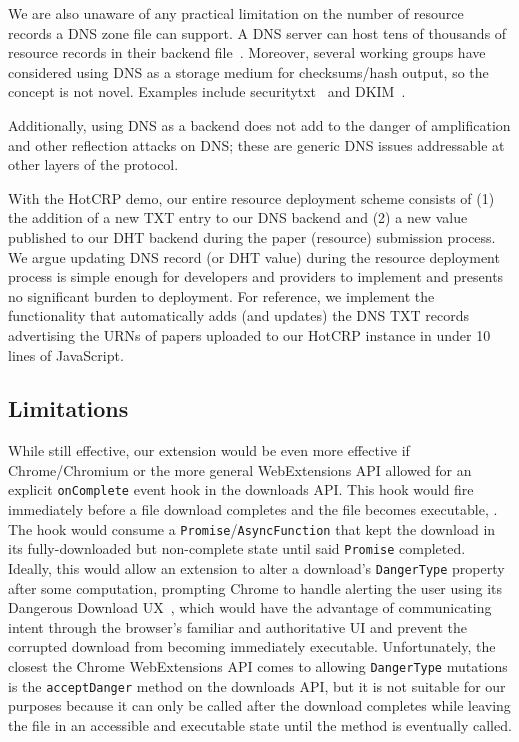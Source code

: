 We are also unaware of any practical limitation on the number of resource
records a DNS zone file can support. A DNS server can host tens of thousands of
resource records in their backend file~\cite{DNS1, DNS2}. Moreover, several
working groups have considered using DNS as a storage medium for checksums/hash
output, so the concept is not novel. Examples include
securitytxt~\cite{draft-sectxt} and DKIM~\cite{DKIM}.

Additionally, using DNS as a backend does not add to the danger of amplification
and other reflection attacks on DNS; these are generic DNS issues addressable at
other layers of the protocol.

With the HotCRP demo, our entire resource deployment scheme consists of (1) the
addition of a new TXT entry to our DNS backend and (2) a new value published to
our DHT backend during the paper (resource) submission process. We argue
updating DNS record (or DHT value) during the resource deployment process is
simple enough for developers and providers to implement and presents no
significant burden to deployment. For reference, we implement the functionality
that automatically adds (and updates) the DNS TXT records advertising the URNs
of papers uploaded to our HotCRP instance in under 10 lines of JavaScript.

\subsection{Limitations}

While still effective, our extension would be even more effective if
Chrome/Chromium or the more general WebExtensions API allowed for an explicit
\texttt{onComplete} event hook in the downloads API. This hook would fire
immediately before a file download completes and the file becomes executable,
. The
hook would consume a \texttt{Promise}/\texttt{AsyncFunction} that kept the
download in its fully-downloaded but non-complete state until said
\texttt{Promise} completed. Ideally, this would allow an extension to alter a
download's \texttt{DangerType} property after some computation, prompting Chrome
to handle alerting the user using its Dangerous Download
UX~\cite{ChromeClickThrough}, which would have the advantage of communicating
intent through the browser's familiar and authoritative UI and prevent the
corrupted download from becoming immediately executable. Unfortunately, the
closest the Chrome WebExtensions API comes to allowing \texttt{DangerType}
mutations is the \texttt{acceptDanger} method on the downloads API, but it is
not suitable for our purposes because it can only be called after the download
completes while leaving the file in an accessible and executable state until the
method is eventually called.

